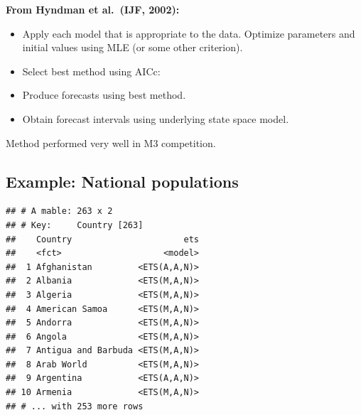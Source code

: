 \documentclass[]{book}
\newenvironment{Shaded}{\begin{snugshade}}{\end{snugshade}}
\newcommand{\DataTypeTok}[1]{\textcolor[rgb]{0.13,0.29,0.53}{#1}}
\newcommand{\DecValTok}[1]{\textcolor[rgb]{0.00,0.00,0.81}{#1}}
\newcommand{\FloatTok}[1]{\textcolor[rgb]{0.00,0.00,0.81}{#1}}
\newcommand{\KeywordTok}[1]{\textcolor[rgb]{0.13,0.29,0.53}{\textbf{#1}}}
\newcommand{\NormalTok}[1]{#1}
\newcommand{\OperatorTok}[1]{\textcolor[rgb]{0.81,0.36,0.00}{\textbf{#1}}}
\newcommand{\StringTok}[1]{\textcolor[rgb]{0.31,0.60,0.02}{#1}}
\providecommand{\tightlist}{%
  \setlength{\itemsep}{0pt}\setlength{\parskip}{0pt}}
\begin{document}
\textbf{From Hyndman et al.~(IJF, 2002):}

\begin{itemize}
\tightlist
\item
  Apply each model that is appropriate to the data.
  Optimize parameters and initial values using MLE (or some other
  criterion).
\item
  Select best method using AICc:
\item
  Produce forecasts using best method.
\item
  Obtain forecast intervals using underlying state space model.
\end{itemize}

Method performed very well in M3 competition.

\hypertarget{example-national-populations}{%
\subsection{Example: National populations}\label{example-national-populations}}

\begin{Shaded}
\end{Shaded}

\begin{verbatim}
## # A mable: 263 x 2
## # Key:     Country [263]
##    Country                      ets
##    <fct>                    <model>
##  1 Afghanistan         <ETS(A,A,N)>
##  2 Albania             <ETS(M,A,N)>
##  3 Algeria             <ETS(M,A,N)>
##  4 American Samoa      <ETS(M,A,N)>
##  5 Andorra             <ETS(M,A,N)>
##  6 Angola              <ETS(M,A,N)>
##  7 Antigua and Barbuda <ETS(M,A,N)>
##  8 Arab World          <ETS(M,A,N)>
##  9 Argentina           <ETS(A,A,N)>
## 10 Armenia             <ETS(M,A,N)>
## # ... with 253 more rows
\end{verbatim}

\begin{Shaded}
\end{Shaded}
\end{document}
